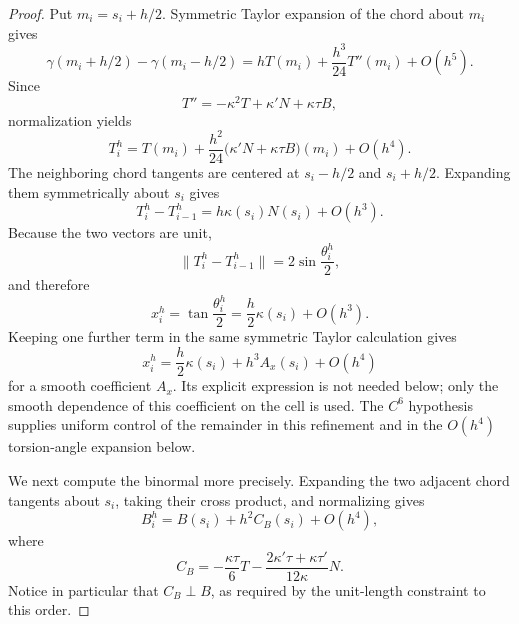 \documentclass[10pt,a4paper]{amsart}
\begin{document}
\begin{proof}
Put \(m_i=s_i+h/2\). Symmetric Taylor expansion of the chord about \(m_i\) gives
\[
\gamma(m_i+h/2)-\gamma(m_i-h/2)
=hT(m_i)+\frac{h^3}{24}T''(m_i)+O(h^5).
\]
Since
\[
T''=-\kappa^2T+\kappa'N+\kappa\tau B,
\]
normalization yields
\begin{equation}
T_i^h
=
T(m_i)+\frac{h^2}{24}
\bigl(\kappa'N+\kappa\tau B\bigr)(m_i)+O(h^4).
\label{eq:chord-expansion}
\end{equation}
The neighboring chord tangents are centered at \(s_i-h/2\) and
\(s_i+h/2\). Expanding them symmetrically about \(s_i\) gives
\[
T_i^h-T_{i-1}^h=h\kappa(s_i)N(s_i)+O(h^3).
\]
Because the two vectors are unit,
\[
\|T_i^h-T_{i-1}^h\|
=2\sin\frac{\theta_i^h}{2},
\]
and therefore
\begin{equation}
x_i^h=\tan\frac{\theta_i^h}{2}
=\frac h2\kappa(s_i)+O(h^3).
\label{eq:x-asymptotic}
\end{equation}
Keeping one further term in the same symmetric Taylor calculation gives
\[
x_i^h=\frac h2\kappa(s_i)+h^3A_x(s_i)+O(h^4)
\]
for a smooth coefficient $A_x$. Its explicit expression is not needed below; only the smooth dependence of this coefficient on the cell is used. The $C^6$ hypothesis supplies uniform control of the remainder in this refinement and in the $O(h^4)$ torsion-angle expansion below.

We next compute the binormal more precisely.  Expanding the two adjacent
chord tangents about \(s_i\), taking their cross product, and normalizing
gives
\begin{equation}
B_i^h
=
B(s_i)+h^2C_B(s_i)+O(h^4),
\label{eq:B-asymptotic}
\end{equation}
where
\begin{equation}
C_B
=
-\frac{\kappa\tau}{6}T
-\frac{2\kappa'\tau+\kappa\tau'}{12\kappa}N.
\label{eq:CB-explicit}
\end{equation}
Notice in particular that \(C_B\perp B\), as required by the unit-length
constraint to this order.


\end{proof}
\end{document}
